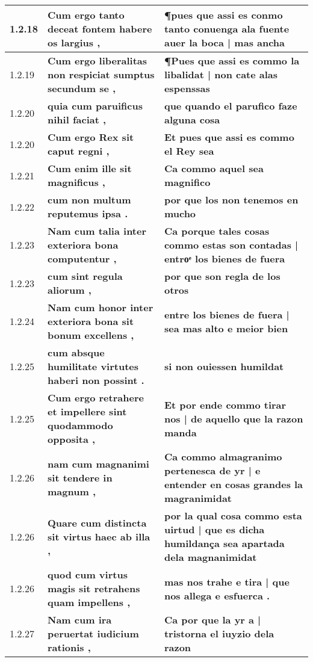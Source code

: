 \begin{tabular}{|p{1cm}|p{6.5cm}|p{6.5cm}|}
1.2.18 &  \textbf{ Cum ergo tanto deceat fontem habere os largius , }  &  \textbf{ ¶pues que assi es conmo tanto conuenga ala fuente auer la boca | mas ancha }  \\\hline
1.2.19 &  \textbf{ Cum ergo liberalitas non respiciat sumptus secundum se , }  &  \textbf{ ¶Pues que assi es commo la libalidat | non cate alas espenssas }  \\\hline
1.2.20 &  \textbf{ quia cum paruificus nihil faciat , }  &  \textbf{ que quando el parufico faze alguna cosa }  \\\hline
1.2.20 &  \textbf{ Cum ergo Rex sit caput regni , }  &  \textbf{ Et pues que assi es commo el Rey sea }  \\\hline
1.2.21 &  \textbf{ Cum enim ille sit magnificus , }  &  \textbf{ Ca commo aquel sea magnifico }  \\\hline
1.2.22 &  \textbf{ cum non multum reputemus ipsa . }  &  \textbf{ por que los non tenemos en mucho }  \\\hline
1.2.23 &  \textbf{ Nam cum talia inter exteriora bona computentur , }  &  \textbf{ Ca porque tales cosas commo estas son contadas | entroͤ los bienes de fuera }  \\\hline
1.2.23 &  \textbf{ cum sint regula aliorum , }  &  \textbf{ por que son regla de los otros }  \\\hline
1.2.24 &  \textbf{ Nam cum honor inter exteriora bona sit bonum excellens , }  &  \textbf{ entre los bienes de fuera | sea mas alto e meior bien }  \\\hline
1.2.25 &  \textbf{ cum absque humilitate virtutes haberi non possint . }  &  \textbf{ si non ouiessen humildat }  \\\hline
1.2.25 &  \textbf{ Cum ergo retrahere et impellere sint quodammodo opposita , }  &  \textbf{ Et por ende commo tirar nos | de aquello que la razon manda }  \\\hline
1.2.26 &  \textbf{ nam cum magnanimi sit tendere in magnum , }  &  \textbf{ Ca commo almagranimo pertenesca de yr | e entender en cosas grandes la magranimidat }  \\\hline
1.2.26 &  \textbf{ Quare cum distincta sit virtus haec ab illa , }  &  \textbf{ por la qual cosa commo esta uirtud | que es dicha humildança sea apartada dela magnanimidat }  \\\hline
1.2.26 &  \textbf{ quod cum virtus magis sit retrahens quam impellens , }  &  \textbf{ mas nos trahe e tira | que nos allega e esfuerca . }  \\\hline
1.2.27 &  \textbf{ Nam cum ira peruertat iudicium rationis , }  &  \textbf{ Ca por que la yr a | tristorna el iuyzio dela razon }  \\\hline

\end{tabular}
